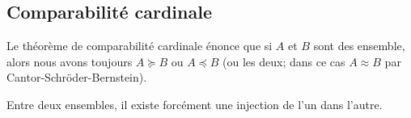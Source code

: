 \subsection{Comparabilité cardinale}

Le théorème de comparabilité cardinale énonce que si \( A\) et \( B\) sont des ensemble, alors nous avons toujours \( A\succeq B\) ou \( A\preceq B\) (ou les deux; dans ce cas \( A\approx B\) par Cantor-Schröder-Bernstein).
\begin{theorem}     \label{THOooCBSKooCmzfUf}
    Entre deux ensembles, il existe forcément une injection de l'un dans l'autre.
\end{theorem}

